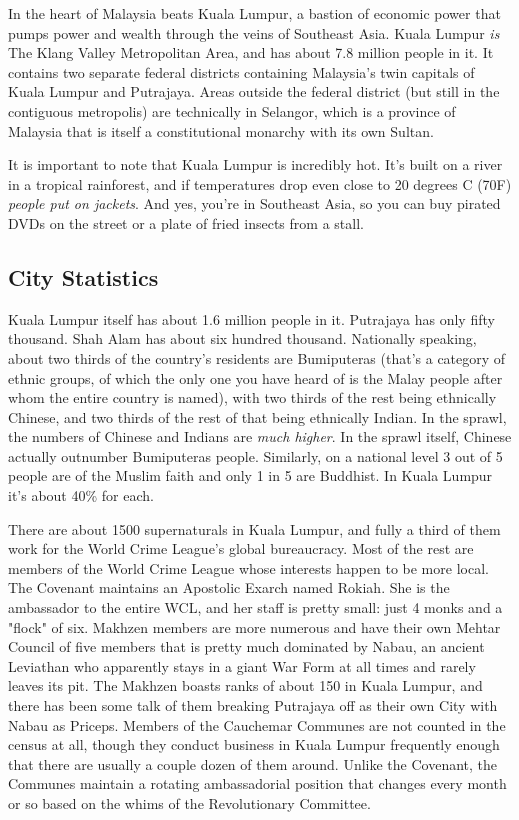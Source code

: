 In the heart of Malaysia beats Kuala Lumpur, a bastion of economic power that pumps power and wealth through the veins of Southeast Asia. Kuala Lumpur \textit{is} The Klang Valley Metropolitan Area, and has about 7.8 million people in it. It contains two separate federal districts containing Malaysia's twin capitals of Kuala Lumpur and Putrajaya. Areas outside the federal district (but still in the contiguous metropolis) are technically in Selangor, which is a province of Malaysia that is itself a constitutional monarchy with its own Sultan.

It is important to note that Kuala Lumpur is incredibly hot. It's built on a river in a tropical rainforest, and if temperatures drop even close to 20 degrees C (70F) \textit{people put on jackets}. And yes, you're in Southeast Asia, so you can buy pirated DVDs on the street or a plate of fried insects from a stall.

\subsection{City Statistics}

\hspace{\parindent} Kuala Lumpur itself has about 1.6 million people in it. Putrajaya has only fifty thousand. Shah Alam has about six hundred thousand. Nationally speaking, about two thirds of the country's residents are Bumiputeras (that's a category of ethnic groups, of which the only one you have heard of is the Malay people after whom the entire country is named), with two thirds of the rest being ethnically Chinese, and two thirds of the rest of that being ethnically Indian. In the sprawl, the numbers of Chinese and Indians are \textit{much higher}. In the sprawl itself, Chinese actually outnumber Bumiputeras people. Similarly, on a national level 3 out of 5 people are of the Muslim faith and only 1 in 5 are Buddhist. In Kuala Lumpur it's about 40\% for each.

There are about 1500 supernaturals in Kuala Lumpur, and fully a third of them work for the World Crime League's global bureaucracy. Most of the rest are members of the World Crime League whose interests happen to be more local. The Covenant maintains an Apostolic Exarch named Rokiah. She is the ambassador to the entire WCL, and her staff is pretty small: just 4 monks and a "flock" of six. Makhzen members are more numerous and have their own Mehtar Council of five members that is pretty much dominated by Nabau, an ancient Leviathan who apparently stays in a giant War Form at all times and rarely leaves its pit. The Makhzen boasts ranks of about 150 in Kuala Lumpur, and there has been some talk of them breaking Putrajaya off as their own City with Nabau as Priceps. Members of the Cauchemar Communes are not counted in the census at all, though they conduct business in Kuala Lumpur frequently enough that there are usually a couple dozen of them around. Unlike the Covenant, the Communes maintain a rotating ambassadorial position that changes every month or so based on the whims of the Revolutionary Committee.

